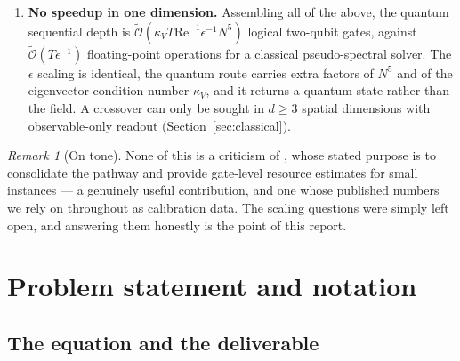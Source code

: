 \documentclass[11pt,a4paper]{article}
\theoremstyle{plain}
\theoremstyle{definition}
\theoremstyle{remark}
\newtheorem{remark}[proposition]{Remark}
\newcommand{\Rey}{\mathrm{Re}}
\newcommand{\Ot}{\widetilde{\mathcal{O}}}
\begin{document}
\begin{enumerate}[leftmargin=*]
\item \textbf{No speedup in one dimension.}
Assembling all of the above, the quantum sequential depth is
$\Ot(\kappa_V T\Rey^{-1}\epsilon^{-1}N^5)$ logical two-qubit gates, against
$\Ot(T\epsilon^{-1})$ floating-point operations for a classical pseudo-spectral
solver.  The $\epsilon$ scaling is identical, the quantum route carries extra
factors of $N^5$ and of the eigenvector condition number $\kappa_V$, and it
returns a quantum state rather than the field.  A crossover can only be sought
in $d\ge3$ spatial dimensions with observable-only readout
(Section~\ref{sec:classical}).

\end{enumerate}

\begin{remark}[On tone]
None of this is a criticism of \cite{Setty2026}, whose stated purpose is to
consolidate the pathway and provide gate-level resource estimates for small
instances --- a genuinely useful contribution, and one whose published numbers
we rely on throughout as calibration data.  The scaling questions were simply
left open, and answering them honestly is the point of this report.
\end{remark}

\section{Problem statement and notation}

\subsection{The equation and the deliverable}
\end{document}
